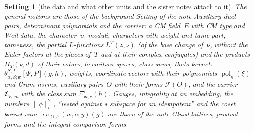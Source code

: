\documentclass[11pt,a4paper]{article}
\newcommand{\m}[1]{\mbox{$#1$}}        %
\theoremstyle{plainx}
\theoremstyle{uprightx}
\newtheorem{setting}[theorem]{Setting}          %
\newcommand{\tk}[7]{\theta^{#1,#2}_{#3,#4;#5}[#6,#7]}
\newcommand{\LP}[3]{\Pi_{#1}(#2,#3)}
\newcommand{\FormVx}[1]{\mathcal{F}(#1)}
\newcommand{\nsq}[2]{\|#1\|^{2}_{#2}}
\newcommand{\cks}[5]{\operatorname{cks}_{#1,#2}(#3,#4;#5)}
\newcommand{\carrier}[2]{\mathfrak{C}_{#1,#2}}
\newcommand{\cXi}[3]{\Xi^{\circ}_{#1,#2}(#3)}
\begin{document}
\begin{setting}[the data and what other units and the sister notes attach to it]\label{set:data}
The general notions are those of the background Setting of the note \emph{Auxiliary dual pairs, determinant
polynomials and the carrier}: a CM field~$E$ with CM type and Weil data, the character~$\upsilon$, moduli, characters with weight and
tame part, tameness, the partial $L$-functions \m{L^{T}(z,\nu)} (of the base change of~$\nu$, without the Euler
factors at the places of~$T$ and at their complex conjugates) and the products \m{\LP{T}{\nu}{d}} of their values,
hermitian spaces, class sums, theta kernels
\m{\tk{S}{T}{\alpha}{\beta}{\mathfrak{m}}{\Psi}{P}(g,h)}, weights, coordinate vectors with their polynomials
\m{\operatorname{pol}_\kappa(\xi)} and Gram norms, auxiliary pairs~$O$ with their forms \m{\FormVx{O}}, and the carrier
\m{\carrier{E}{m}} with the class sum \m{\cXi{m}{c}{h}}. Gauges, integrality at an embedding, the numbers
\m{\nsq{\phi}{\sigma}}, ``tested against a subspace for an idempotent'' and the coset kernel sum
\m{\cks{O}{b}{w}{e}{y}(g)} are those of the note \emph{Glued
lattices, product forms and the integral comparison forms}.


\end{setting}
\end{document}
